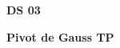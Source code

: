 \documentclass[a4paper,12pt,titlepage,twoside]{article}
\begin{document}
 
 
\begin{center} 
 \textbf{DS 03} 
 \end{center} 
  
 
 \cleardoublepage 
 
\begin{center} 
 \textbf{Pivot de Gauss TP} 
 \end{center} 
  
 
 \cleardoublepage 
 

 
\end{document}
